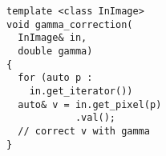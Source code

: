 \documentclass[varwidth=4cm,border={0.1cm 0.1cm 0.1cm 0.1cm}]{standalone}
\begin{document}
\begin{verbatim}
template <class InImage>
void gamma_correction(
  InImage& in,
  double gamma)
{
  for (auto p :
    in.get_iterator())
  auto& v = in.get_pixel(p)
            .val();
  // correct v with gamma
}
\end{verbatim}
\end{document}
